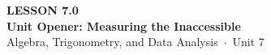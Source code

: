 \documentclass[aspectratio=169, 11pt]{beamer}
\begin{document}
{
\begin{frame}[plain]
  \vspace{2.8cm}\hspace{0.55cm}%
  \begin{minipage}{0.9\textwidth}
    {\color{goldacc}\bfseries\small LESSON 7.0}\\[0.5cm]
    {\color{white}\bfseries\LARGE Unit Opener: Measuring the Inaccessible}\\[1.2cm]
    {\color{mistmid}\small Algebra, Trigonometry, and Data Analysis~$\cdot$~Unit 7}
  \end{minipage}
\end{frame}
}

\begin{frame}[t, plain]
\end{frame}
\end{document}
